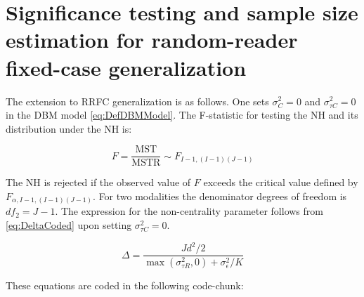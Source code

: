 \documentclass[
]{book}
\begin{document}
\hypertarget{significance-testing-and-sample-size-estimation-for-random-reader-fixed-case-generalization}{%
\section{Significance testing and sample size estimation for random-reader fixed-case generalization}\label{significance-testing-and-sample-size-estimation-for-random-reader-fixed-case-generalization}}

The extension to RRFC generalization is as follows. One sets \(\sigma_C^2 = 0\) and \(\sigma_{\tau C}^2 = 0\) in the DBM model \eqref{eq:DefDBMModel}. The F-statistic for testing the NH and its distribution under the NH is:

\begin{equation}
F=\frac{\text{MST}}{\text{MSTR}} \sim F_{I-1,(I-1)(J-1)}
\label{eq:DefFStatFRRC-DBM2}
\end{equation}

The NH is rejected if the observed value of \(F\) exceeds the critical value defined by \(F_{\alpha, I-1,(I-1)(J-1)}\). For two modalities the denominator degrees of freedom is \(df_2 = J-1\). The expression for the non-centrality parameter follows from \eqref{eq:DeltaCoded} upon setting \(\sigma_{\tau C}^2 = 0\).

\begin{equation}
\Delta=\frac{Jd^2/2}{\max(\sigma_{\tau R}^2,0)+\sigma_{\epsilon}^2/K}
\label{eq:DefDeltaRRFC}
\end{equation}

These equations are coded in the following code-chunk:
\end{document}
